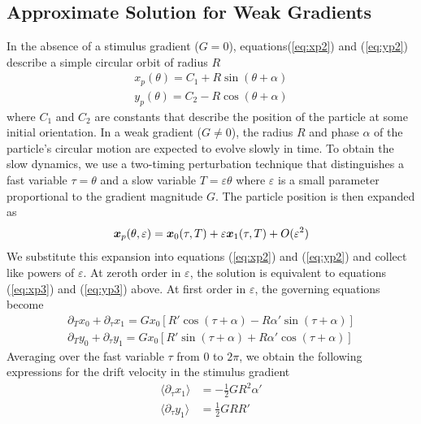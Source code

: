 \begin{appendices}
\subsection{Approximate Solution for Weak Gradients}

In the absence of a stimulus gradient ($G=0$), equations(\ref{eq:xp2}) and (\ref{eq:yp2}) describe a simple circular orbit of radius $R$
\begin{align}
    x_p(\theta) = C_1 + R \sin(\theta + \alpha) \label{eq:xp3} 
    \\
    y_p(\theta) = C_2 - R \cos(\theta + \alpha)\label{eq:yp3} 
\end{align}
where $C_1$ and $C_2$ are constants that describe the position of the particle at some initial orientation.  In a weak gradient ($G\neq 0$), the radius $R$ and phase $\alpha$ of the particle's circular motion are expected to evolve slowly in time.  To obtain the slow dynamics, we use a two-timing perturbation technique\autocite{Strogatz2015} that distinguishes a fast variable $\tau=\theta$ and a slow variable $T=\varepsilon \theta$ where $\varepsilon$ is a small parameter proportional to the gradient magnitude $G$. The particle position is then expanded as
\begin{equation}
    \boldsymbol{x}_p(\theta,\varepsilon) = \boldsymbol{x}_0(\tau,T) + \varepsilon \boldsymbol{x}_1(\tau,T) + O(\varepsilon^2)
\end{equation}
We substitute this expansion into equations (\ref{eq:xp2}) and (\ref{eq:yp2}) and collect like powers of $\varepsilon$. At zeroth order in $\varepsilon$, the solution is equivalent to equations (\ref{eq:xp3}) and (\ref{eq:yp3}) above. At first order in $\varepsilon$, the governing equations become
\begin{align}
    \partial_T x_0 + \partial_{\tau} x_1 = G x_0 \left[ R' \cos(\tau + \alpha) - R \alpha' \sin(\tau + \alpha)\right] \label{eq:xp4} 
    \\
    \partial_T y_0 + \partial_{\tau} y_1 = G x_0 \left[ R' \sin(\tau + \alpha) + R \alpha' \cos(\tau + \alpha)\right] \label{eq:yp4}
\end{align}
Averaging over the fast variable $\tau$ from 0 to $2\pi$, we obtain the following expressions for the drift velocity in the stimulus gradient    
\begin{align}
    \langle \partial_{\tau} x_1 \rangle &=  - \tfrac{1}{2} G R^2\alpha' \label{eq:drift}
    \\
    \langle \partial_{\tau} y_1 \rangle &= \tfrac{1}{2} G R R' \label{eq:drift2}

\end{align}
\end{appendices}
